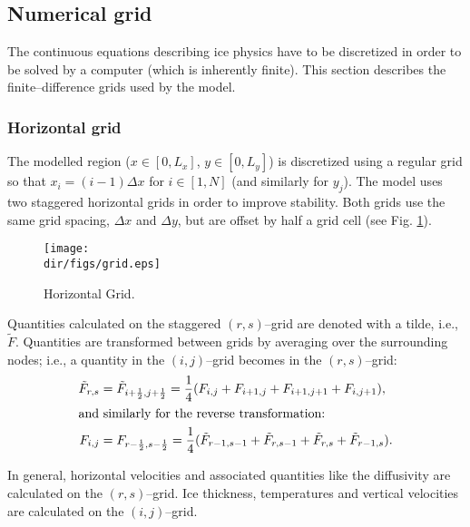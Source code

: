 \subsection{Numerical grid}\label{num.sec.grid}
The continuous equations describing ice physics have to be discretized in order to be solved by a computer (which is inherently finite). This section describes the finite--difference grids used by the model.
\subsubsection{Horizontal grid}
The modelled region ($x\in[0,L_x]$, $y\in[0,L_y]$) is discretized using a regular grid so that $x_i=(i-1)\Delta x$ for $i\in[1,N]$ (and similarly for $y_j$). The model uses two staggered horizontal grids in order to improve stability. Both grids use the same grid spacing, $\Delta x$ and $\Delta y$, but are offset by half a grid cell (see Fig. \ref{kin.fig.grid}). 
\begin{figure}[htbp]
  \begin{center}
    \texttt{[image: \\dir/figs/grid.eps]}
    \caption{Horizontal Grid.}
    \label{kin.fig.grid}
  \end{center}
\end{figure}
Quantities calculated on the staggered $(r,s)$--grid are denoted with a tilde, i.e., $\tilde{F}$. Quantities are transformed between grids by averaging over the surrounding nodes; i.e., a quantity in the $(i,j)$--grid becomes in the $(r,s)$--grid:
\begin{subequations}
  \begin{align}
    \tilde{F}_{r,s}&=\tilde{F}_{i+\frac12,j+\frac12}=\frac14(F_{i,j}+F_{i+1,j}+F_{i+1,j+1}+F_{i,j+1}),\\
    \intertext{and similarly for the reverse transformation:}
    F_{i,j}&=F_{r-\frac12,s-\frac12}=\frac14(\tilde{F}_{r-1,s-1}+\tilde{F}_{r,s-1}+\tilde{F}_{r,s}+\tilde{F}_{r-1,s}).
  \end{align}
\end{subequations}

In general, horizontal velocities and associated quantities like the diffusivity are calculated on the $(r,s)$--grid. Ice thickness, temperatures and vertical velocities are calculated on the $(i,j)$--grid.

